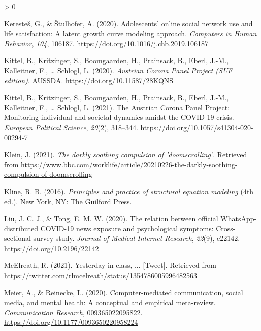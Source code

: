 \documentclass[
  english,
  man,floatsintext]{apa6}
\newlength{\cslhangindent}
\newenvironment{CSLReferences}[2] %
 {%
  \setlength{\parindent}{0pt}
  \ifodd #1 \everypar{\setlength{\hangindent}{\cslhangindent}}\ignorespaces\fi
  \ifnum #2 > 0
  \setlength{\parskip}{#2\baselineskip}
  \fi
 }%
 {}
\begin{document}
\begin{CSLReferences}{1}{0}
\leavevmode\hypertarget{ref-kerestesAdolescentsOnlineSocial2020}{}%
Keresteš, G., \& Štulhofer, A. (2020). Adolescents' online social network use and life satisfaction: {A} latent growth curve modeling approach. \emph{Computers in Human Behavior}, \emph{104}, 106187. \url{https://doi.org/10.1016/j.chb.2019.106187}

\leavevmode\hypertarget{ref-kittelAustrianCoronaPanel2020}{}%
Kittel, B., Kritzinger, S., Boomgaarden, H., Prainsack, B., Eberl, J.-M., Kalleitner, F., \ldots{} Schlogl, L. (2020). \emph{Austrian {Corona} {Panel} {Project} ({SUF} edition)}. AUSSDA. \url{https://doi.org/10.11587/28KQNS}

\leavevmode\hypertarget{ref-kittelAustrianCoronaPanel2021}{}%
Kittel, B., Kritzinger, S., Boomgaarden, H., Prainsack, B., Eberl, J.-M., Kalleitner, F., \ldots{} Schlogl, L. (2021). The {Austrian} {Corona} {Panel} {Project}: Monitoring individual and societal dynamics amidst the {COVID}-19 crisis. \emph{European Political Science}, \emph{20}(2), 318--344. \url{https://doi.org/10.1057/s41304-020-00294-7}

\leavevmode\hypertarget{ref-kleinDarklySoothingCompulsion2021}{}%
Klein, J. (2021). \emph{The darkly soothing compulsion of 'doomscrolling'}. Retrieved from \url{https://www.bbc.com/worklife/article/20210226-the-darkly-soothing-compulsion-of-doomscrolling}

\leavevmode\hypertarget{ref-klinePrinciplesPracticeStructural2016}{}%
Kline, R. B. (2016). \emph{Principles and practice of structural equation modeling} (4th ed.). New York, NY: The Guilford Press.

\leavevmode\hypertarget{ref-liuRelationOfficialWhatsAppdistributed2020}{}%
Liu, J. C. J., \& Tong, E. M. W. (2020). The relation between official {WhatsApp}-distributed {COVID}-19 news exposure and psychological symptoms: Cross-sectional survey study. \emph{Journal of Medical Internet Research}, \emph{22}(9), e22142. \url{https://doi.org/10.2196/22142}

\leavevmode\hypertarget{ref-mcelreathYesterdayClass2021}{}%
McElreath, R. (2021). Yesterday in class, ... {[}Tweet{]}. Retrieved from \url{https://twitter.com/rlmcelreath/status/1354786005996482563}

\leavevmode\hypertarget{ref-meierComputermediatedCommunicationSocial2020a}{}%
Meier, A., \& Reinecke, L. (2020). Computer-mediated communication, social media, and mental health: {A} conceptual and empirical meta-review. \emph{Communication Research}, 009365022095822. \url{https://doi.org/10.1177/0093650220958224}


\end{CSLReferences}
\end{document}
